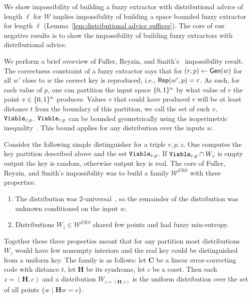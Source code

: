 We show impossibility of building a fuzzy extractor with distributional advice of length $\ell$ for $\mathcal{W}$ implies impossibility of building a space bounded fuzzy extractor for length $\ell$ (Lemma~\ref{lem:distributional advice suffices}). 
The core of our negative results is to show the impossibility of building fuzzy extractors with distributional advice.   

We perform a brief overview of Fuller, Reyzin, and Smith's~\cite{fuller2020fuzzy} impossibility result.
The correctness constraint of a fuzzy extractor says that for $(r, p)\leftarrow {\ensuremath{\mathsf{Gen}}}(w)$ for all $w'$ close to $w$ the correct key is reproduced, i.e., ${\mathsf{Rep}}(w', p)=r$.  As such, for each value of $p$, one can partition the input space $\{0, 1\}^n$ by what value of $r$ the point  $v\in \{0, 1\}^n$ produces.  Values $v$ that could have produced  $r$ will be at least distance $t$ from the boundary of this partition, we call the set of such $v$, $\mathtt{Viable}_{r,p}$.  $\mathtt{Viable}_{r,p}$ can be bounded geometrically using the isoperimetric inequality~\cite{harper1966optimal}.  This bound applies for any distribution over the inputs $w$.

Consider the following simple distinguisher for a triple $r, p, z$.  One computes the key partition described above and the set $\mathtt{Viable}_{r,p}$. If $\mathtt{Viable}_{r,p} \cap W_z $ is empty output the key is random, otherwise output key is real. 
The core of Fuller, Reyzin, and Smith's impossibility was to build a family $\mathcal{W}^{FRS}$ with three properties:
\begin{enumerate}
\item The distribution was $2$-universal~\cite{carter1977universal}, so the remainder of the distribution was unknown conditioned on the input $w$. 
\item Distributions $W_z \in \mathcal{W}^{FRS}$ shared few points and had fuzzy min-entropy.
\end{enumerate}
Together these three properties meant that for any partition most distributions $W_z$ would have few nonempty interiors and the real key could be distinguished from a uniform key.  
The family is as follows: let $\mathbf{C}$ be a linear error-correcting code with distance $t$, let $\mathbf{H}$ be its syndrome, let $c$ be a coset.  Then each $z = (\mathbf{H}, c)$ and a distribution $W_{z=(\mathbf{H}, c)}$ is the uniform distribution over  the set of all points $\{w \mid \mathbf{H} w = c\}$.

